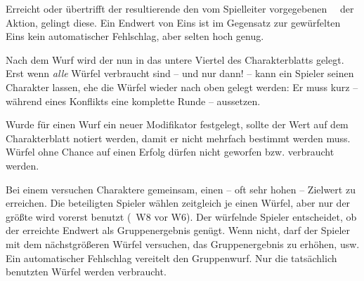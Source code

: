 \begin{multicols}{2}

\noindent
Erreicht oder übertrifft der resultierende  den vom Spielleiter vorgegebenen ~\ziel\ der Aktion, gelingt diese. Ein Endwert von Eins ist im Gegensatz zur gewürfelten Eins kein automatischer Fehlschlag, aber selten hoch genug.

Nach dem Wurf wird der nun  in das untere Viertel des Charakterblatts gelegt. Erst wenn \emph{alle} Würfel verbraucht sind -- und nur dann! -- kann ein Spieler seinen Charakter  lassen, ehe die Würfel wieder nach oben gelegt werden: Er muss kurz -- während eines Konflikts eine komplette Runde -- aussetzen.


\noindent
Wurde für einen Wurf ein neuer Modifikator festgelegt, sollte der Wert auf dem Charakterblatt notiert werden, damit er nicht mehrfach bestimmt werden muss. Würfel ohne Chance auf einen Erfolg dürfen nicht geworfen bzw. verbraucht werden. 

Bei einem  versuchen Charaktere gemeinsam, einen -- oft sehr hohen -- Zielwert zu erreichen. Die beteiligten Spieler wählen zeitgleich je einen Würfel, aber nur der größte wird vorerst benutzt (\zB\ W8 vor W6). Der würfelnde Spieler entscheidet, ob der erreichte Endwert als Gruppenergebnis genügt. Wenn nicht, darf der Spieler mit dem nächstgrößeren Würfel versuchen, das Gruppenergebnis zu erhöhen, usw. Ein automatischer Fehlschlag vereitelt den Gruppenwurf. Nur die tatsächlich benutzten Würfel werden verbraucht.


\end{multicols}
